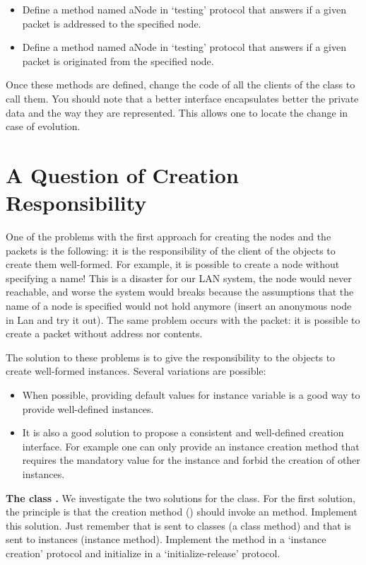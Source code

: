 \begin{itemize}
\item Define a method named  aNode in `testing' protocol that answers if a given packet is addressed to the specified node. 

\item Define a method named  aNode in `testing' protocol that answers if a given packet is originated from the specified node. 
\end{itemize}

Once these methods are defined, change the code of all the clients of the class  to call them. You should note that a better interface encapsulates better the private data and the way they are represented. This allows one to locate the change in case of evolution.

\section{A Question of Creation Responsibility}
One of the problems with the first approach for creating the nodes and the packets is the following: it is the responsibility of the client of the objects to create them well-formed. For 
example, it is possible to create a node without specifying a name! This is a disaster for our LAN system, the node would never reachable, and worse the system would breaks because the assumptions that the name of a node is specified would not hold anymore (insert an anonymous node in Lan and try it out). The same problem occurs with the packet: it is possible to create a packet without address nor contents.

The solution to these problems is to give the responsibility to the objects to create well-formed instances. Several variations are possible:

\begin{itemize}
\item
When possible, providing default values for instance variable 
is a good way to provide well-defined instances.
\item
It is also a good solution to propose a consistent and well-defined 
creation interface. For example one can only provide an instance 
creation method that requires the mandatory value for the instance 
and forbid the creation of other instances.
\end{itemize}

\textbf{The class .} 
We investigate the two solutions for the  class. For the first solution, the principle is that the creation method () should invoke an  method. Implement this solution. Just remember that  is sent to classes (a class method) and that  is sent to instances (instance method). Implement the method  in a `instance creation' protocol and initialize in a `initialize-release' protocol.

